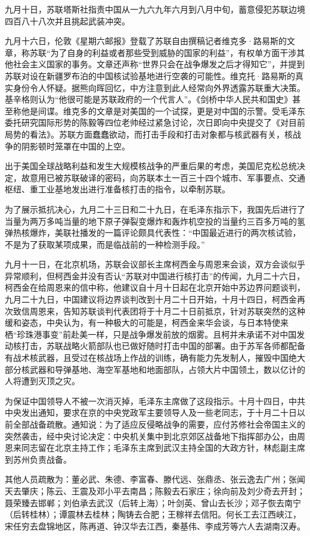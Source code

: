 \begin{maonote}
九月十日，苏联塔斯社指责中国从一九六九年六月到八月中旬，蓄意侵犯苏联边境四百八十八次并且挑起武装冲突。

九月十六日，伦敦《星期六邮报》登载了苏联自由撰稿记者维克多·路易斯的文章，称苏联“为了自身的利益或者那些受到威胁的国家的利益”，有权单方面干涉其他社会主义国家的事务。文章还声称“世界只会在战争爆发之后才得知它”，并提到苏联对设在新疆罗布泊的中国核试验基地进行空袭的可能性。维克托·路易斯的真实身份令人怀疑。据熊向晖回忆，中方注意到此人经常向外界透露苏联重大决策。基辛格则认为“他很可能是苏联政府的一个代言人”。《剑桥中华人民共和国史》甚至称他是间谍。维克多的文章是对美国的一个试探，更是对中国的示警。受毛泽东委托研究国际形势的陈毅等四位老帅经过紧急讨论，次日即向中央提交了《对目前局势的看法》。苏联方面蠢蠢欲动，而打击手段和打击对象都与核武器有关，核战争的阴影顿时笼罩在中国的上空。

出于美国全球战略利益和发生大规模核战争的严重后果的考虑，美国尼克松总统决定，故意用已被苏联破译的密码，向苏联本土一百三十四个城市、军事要点、交通枢纽、重工业基地发出进行准备核打击的指令，以牵制苏联。

为了展示抵抗决心，九月二十三日和二十九日，在毛泽东指示下，我国先后进行了当量为两万多吨当量的地下原子弹裂变爆炸和轰炸机空投的当量约三百多万吨的氢弹热核爆炸，美联社播发的一篇评论颇具代表性：“中国最近进行的两次核试验，不是为了获取某项成果，而是临战前的一种检测手段。”

九月十一日，在北京机场，苏联会议部长主席柯西金与周恩来会谈，双方会谈似乎异常顺利，但柯西金并没有否认“苏联对中国进行核打击”的传闻，九月二十六日，柯西金在给周恩来的信中称，他建议自十月十日起在北京开始中苏边界问题谈判，九月二十九日，中国建议将边界谈判改到十月二十日开始，十月十四日，柯西金再次致信周恩来，告知苏联谈判代表团将于十月二十日前抵京，针对苏联突然的这种缓和姿态，中央认为，有一种极大的可能是，柯西金来华会谈，与日本特使来栖“珍珠港事变”前赴美一样，只是战争爆发前放的烟雾。且柯并未承诺不对中国发动核打击，苏联战略火箭部队也已做好随时打击中国的部署。由于苏军各师都配备有战术核武器，且受过在核战场上作战的训练，确有能力先发制人，摧毁中国绝大部分核武器和导弹基地、海空军基地和地面部队，占领大片中国领土，数以亿计的人将遭到灭顶之灾。

为保证中国领导人不被一次消灭掉，毛泽东主席做了这段指示。十月十四日，中共中央发出通知，要求在京的中央党政军主要领导人及一些老同志，于十月二十日以前全部战备疏散。通知说：为了适应反侵略战争的需要，应付苏修社会帝国主义的突然袭击，经中央讨论决定：中央机关集中到北京郊区战备地下指挥部办公，由周恩来同志留在北京主持工作；毛泽东主席到武汉主持全国的大政方针，林彪副主席到苏州负责战备。

其他人员疏散为：董必武、朱德、李富春、滕代远、张鼎丞、张云逸去广州；张闻天去肇庆；陈云、王震及邓小平去南昌；陈毅去石家庄；徐向前及刘少奇去开封；聂荣臻去邯郸；刘伯承去武汉（后转上海）；叶剑英、曾山去长沙；邓子恢去南宁（后转桂林）；谭震林去桂林；陶铸去合肥；王稼祥去信阳。何长工去江西峡江，宋任穷去盘锦地区，陈再道、钟汉华去江西，秦基伟、李成芳等六人去湖南汉寿。
\end{maonote}
